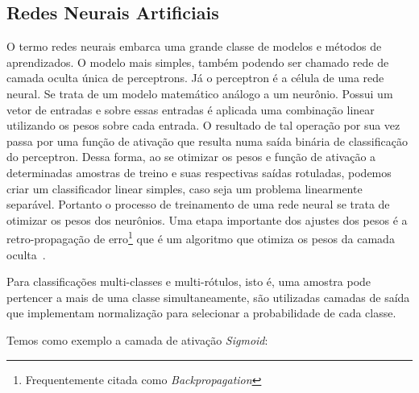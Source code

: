 \subsection{Redes Neurais Artificiais}\label{sec:Cap2_redes_neurais}

O termo redes neurais embarca uma grande classe de modelos e métodos de aprendizados. O modelo mais simples, também podendo ser chamado rede de camada oculta única de perceptrons. Já o  perceptron é a célula de uma rede neural. Se trata de um modelo matemático análogo a um neurônio. Possui um vetor de entradas e sobre essas entradas é aplicada uma combinação linear utilizando os pesos sobre cada entrada. O resultado de tal operação por sua vez passa por uma função de ativação que resulta numa saída binária de classificação do perceptron. Dessa forma, ao se otimizar os pesos e função de ativação a determinadas amostras de treino e suas respectivas saídas rotuladas, podemos criar um classificador linear simples, caso seja um problema linearmente separável. Portanto o processo de treinamento de uma rede neural se trata de otimizar os pesos dos neurônios. 
Uma etapa importante dos ajustes dos pesos é a retro-propagação de erro\footnote{Frequentemente citada como \textit{Backpropagation}} que é um algoritmo que otimiza os pesos da camada oculta~\cite{hastie01statisticallearning}. 

Para classificações multi-classes e multi-rótulos, isto é, uma amostra pode pertencer a mais de uma classe simultaneamente, são utilizadas camadas de saída que implementam normalização para selecionar a probabilidade de cada classe.

Temos como exemplo a camada de ativação \textit{Sigmoid}: 


